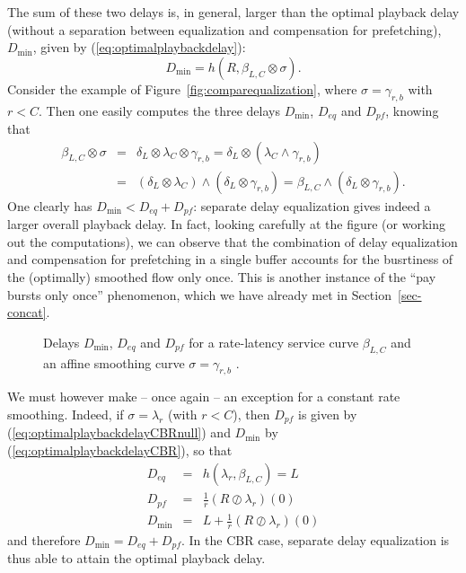 The sum of these two delays is, in general, larger than  the optimal playback delay (without a separation between equalization and compensation for prefetching), $D_{\min}$, given by (\ref{eq:optimalplaybackdelay}):
$$ D_{\min} =   h(R, \beta_{L,C} \otimes \sigma). $$
Consider the example of Figure~\ref{fig:comparequalization}, where  $\sigma = \gamma_{r,b}$ with $r < C$. Then one easily computes the three delays  $D_{\min}$, $D_{eq}$ and $D_{pf}$, knowing that
\begin{eqnarray*}
\beta_{L,C} \otimes \sigma & = & \delta_L \otimes \lambda_C \otimes \gamma_{r,b} = \delta_L \otimes (\lambda_C \wedge \gamma_{r,b}) \\
                           & = & (\delta_L \otimes \lambda_C) \wedge (\delta_L \otimes \gamma_{r,b}) = \beta_{L,C} \wedge (\delta_L \otimes \gamma_{r,b}).
\end{eqnarray*}
One clearly has  $D_{\min} < D_{eq} + D_{pf}$: separate delay equalization gives indeed a larger overall playback delay. In fact, looking carefully at the figure (or working out the computations), we can observe that the combination of delay equalization and compensation for prefetching in a single buffer accounts for the busrtiness of the (optimally) smoothed flow only once. This is another instance of the ``pay bursts only once'' phenomenon, which we have already met in Section~\ref{sec-concat}.

\begin{figure}[h!]
\caption{Delays $D_{\min}$, $D_{eq}$ and $D_{pf}$ for a rate-latency service curve $\beta_{L,C}$ and an affine smoothing curve $\sigma = \gamma_{r,b}$ .}
\protect{}
\end{figure}

We must however make -- once again -- an exception for a constant rate smoothing. Indeed, if $\sigma = \lambda_r$ (with $r < C$), then
$D_{pf}$ is given by  (\ref{eq:optimalplaybackdelayCBRnull}) and $D_{\min}$ by (\ref{eq:optimalplaybackdelayCBR}), so that
\begin{eqnarray*}
D_{eq} & = & h( \lambda_r, \beta_{L,C}) = L \\
 D_{pf} & = & \frac{1}{r} (R \oslash \lambda_r)(0) \\
D_{\min} & = & L + \frac{1}{r} (R \oslash \lambda_r)(0)
\end{eqnarray*}
and therefore $D_{\min} = D_{eq} + D_{pf}$.
In the CBR case, separate delay equalization is thus able to attain the optimal playback delay.

